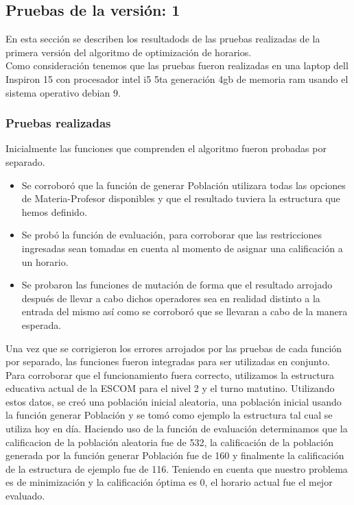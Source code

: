 \subsection{Pruebas de la versión: 1} \label{chp:pruebasV1}
En esta sección se describen los resultadods de las pruebas realizadas de la primera versión del algoritmo de optimización de horarios.\\

Como consideración tenemos que las pruebas fueron realizadas en una laptop dell Inspiron 15 con procesador intel i5 5ta generación 4gb de memoria ram usando el sistema operativo debian 9.\\


\subsubsection{Pruebas realizadas}

Inicialmente las funciones que comprenden el algoritmo fueron probadas por separado. \\

\begin{itemize}
	\item Se corroboró que la función de generar Población utilizara todas las opciones de Materia-Profesor disponibles y que el resultado tuviera la estructura que hemos definido. 
	
	\item Se probó la función de evaluación, para corroborar que las restricciones ingresadas sean tomadas en cuenta al momento de asignar una calificación a un horario.
	
	\item Se probaron las funciones de mutación de forma que el resultado arrojado después de llevar a cabo dichos operadores sea en realidad distinto a la entrada del mismo así como se corroboró que se llevaran a cabo de la manera esperada.
	
\end{itemize}

Una vez que se corrigieron los errores arrojados por las pruebas de cada función por separado, las funciones fueron integradas para ser utilizadas en conjunto. Para corroborar que el funcionamiento fuera correcto, utilizamos la estructura educativa actual de la ESCOM para el nivel 2 y el turno matutino. Utilizando estos datos, se creó una población inicial aleatoria, una población inicial usando la función generar Población y se tomó como ejemplo la estructura tal cual se utiliza hoy en día. Haciendo uso de la función de evaluación determinamos que la calificacion de la población aleatoria fue de 532, la calificación de la población generada por la función generar Población fue de 160 y finalmente la calificación de la estructura de ejemplo fue de 116. Teniendo en cuenta que nuestro problema es de minimización y la calificación óptima es 0, el horario actual fue el mejor evaluado.\\


